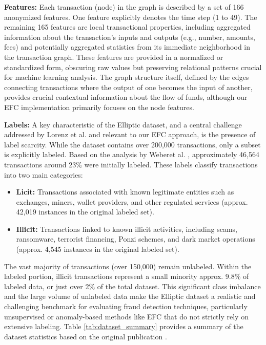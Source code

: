 \documentclass[12pt]{article}
\begin{document}
\textbf{Features:} Each transaction (node) in the graph is described by a set of 166 anonymized features. One feature
explicitly denotes the time step (1 to 49). The remaining 165 features are local transactional properties, including
aggregated information about the transaction's inputs and outputs (e.g., number, amounts, fees) and potentially aggregated
statistics from its immediate neighborhood in the transaction graph. These features are provided in a normalized or
standardized form, obscuring raw values but preserving relational patterns crucial for machine learning analysis. The
graph structure itself, defined by the edges connecting transactions where the output of one becomes the input of another,
provides crucial contextual information about the flow of funds, although our EFC implementation primarily focuses on the
node features.

\textbf{Labels:} A key characteristic of the Elliptic dataset, and a central challenge addressed by Lorenz et al.
\cite{lorenz2021machinelearningmethodsdetect} and relevant to our EFC approach, is the presence of label scarcity. While
the dataset contains over 200,000 transactions, only a subset is explicitly labeled. Based on the analysis by Weberet al.
\cite{weber2019antimoneylaunderingbitcoinexperimenting}, approximately 46,564 transactions around 23\% were initially labeled. These labels classify
transactions into two main categories:

\begin{itemize}
    \item \textbf{Licit:} Transactions associated with known legitimate entities such as exchanges, miners, wallet providers,
      and other regulated services (approx. 42,019 instances in the original labeled set).
    \item \textbf{Illicit:} Transactions linked to known illicit activities, including scams, ransomware, terrorist financing,
      Ponzi schemes, and dark market operations (approx. 4,545 instances in the original labeled set).
\end{itemize}

The vast majority of transactions (over 150,000) remain unlabeled. Within the labeled portion, illicit transactions represent
a small minority approx. 9.8\% of labeled data, or just over 2\% of the total dataset. This significant class imbalance
and the large volume of unlabeled data make the Elliptic dataset a realistic and challenging benchmark for evaluating fraud
detection techniques, particularly unsupervised or anomaly-based methods like EFC that do not strictly rely on extensive
labeling. Table \ref{tab:dataset_summary} provides a summary of the dataset statistics based on the original publication
\cite{weber2019antimoneylaunderingbitcoinexperimenting}.
\end{document}
